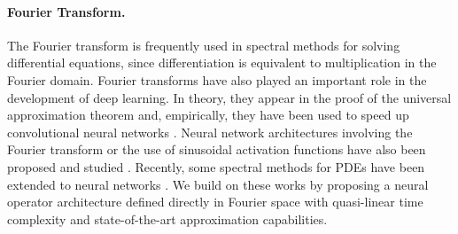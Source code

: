 \documentclass{article} %
\begin{document}

\paragraph{Fourier Transform.}
The Fourier transform is frequently used in spectral methods for solving differential equations, since differentiation is equivalent to multiplication in the Fourier domain.
Fourier transforms have also played an important role in the development of deep learning. In theory, they appear in the proof of the universal approximation theorem \citep{hornik1989multilayer} and, empirically, they have been used to speed up convolutional neural networks \citep{mathieu2013fast}. 
Neural network architectures involving the Fourier transform or the use of sinusoidal activation functions have also been proposed and studied \citep{bengio2007scaling,mingo2004Fourier, sitzmann2020implicit}.
Recently, some spectral methods for PDEs have been extended to neural networks \citep{fan2019bcr, fan2019multiscale, kashinath2020enforcing}. We build on these works by proposing a neural operator architecture defined directly in Fourier space with quasi-linear time complexity and state-of-the-art approximation capabilities. 
\end{document}
